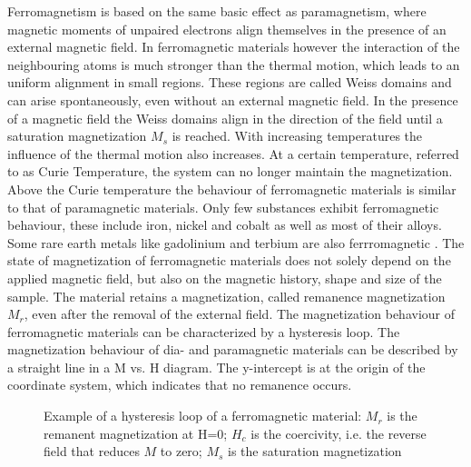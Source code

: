 Ferromagnetism is based on the same basic effect as paramagnetism, where magnetic moments of unpaired electrons align themselves in the presence of an external magnetic field. In ferromagnetic materials however the interaction of the neighbouring atoms is much stronger than the thermal motion, which leads to an uniform alignment in small regions. These regions are called Weiss domains and can arise spontaneously, even without an external magnetic field. In the presence of a magnetic field the Weiss domains align in the direction of the field until a saturation magnetization $M_{s}$ is reached. With increasing temperatures the influence of the thermal motion also increases. At a certain temperature, referred to as Curie Temperature, the system can no longer maintain the magnetization. Above the Curie temperature the behaviour of ferromagnetic materials is similar to that of paramagnetic materials. Only few substances exhibit ferromagnetic behaviour, these include iron, nickel and cobalt as well as most of their alloys. Some rare earth metals like gadolinium and terbium are also ferrromagnetic \cite{svoboda2004magnetic}. The state of magnetization of ferromagnetic materials does not solely depend on the applied magnetic field, but also on the magnetic history, shape and size of the sample. The material retains a magnetization, called remanence magnetization $M_{r}$, even after the removal of the external field. The magnetization behaviour of ferromagnetic materials can be characterized by a hysteresis loop. The magnetization behaviour of dia- and paramagnetic materials can be described by a straight line in a M vs. H diagram. The y-intercept is at the origin of the coordinate system, which indicates that no remanence occurs.  

\begin{figure}[h]
\centering

\caption[Hysteresis loop of a ferromagnetic material]{Example of a hysteresis loop of a ferromagnetic material: $M_{r}$ is the remanent magnetization at H=0; ${H}_{c}$ is the coercivity, i.e. the reverse field that reduces $M$ to zero; $M_{s}$ is the saturation magnetization
\label{fig:hyst_loop}
}
\end{figure}

